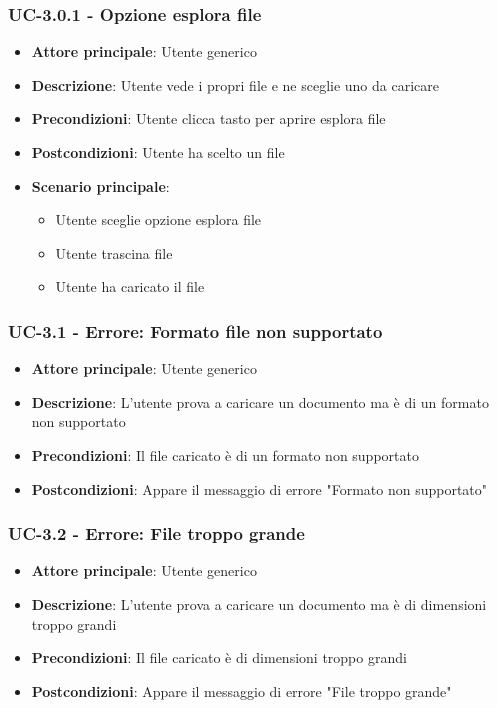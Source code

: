 \documentclass[11pt,a4paper]{article}
\begin{document}
\subsubsection{UC-3.0.1 - Opzione esplora file}
\begin{itemize}
    \item \textbf{Attore principale}: Utente generico
    \item \textbf{Descrizione}: Utente vede i propri file e ne sceglie uno da caricare
    \item \textbf{Precondizioni}: Utente clicca tasto per aprire esplora file
    \item \textbf{Postcondizioni}: Utente ha scelto un file
    \item \textbf{Scenario principale}:
        \begin{itemize}
            \item Utente sceglie opzione esplora file
            \item Utente trascina file
            \item Utente ha caricato il file
        \end{itemize}
\end{itemize}

\subsubsection{UC-3.1 - Errore: Formato file non supportato}
\begin{itemize}
    \item \textbf{Attore principale}: Utente generico
    \item \textbf{Descrizione}: L'utente prova a caricare un documento ma è di un formato non supportato
    \item \textbf{Precondizioni}: Il file caricato è di un formato non supportato
    \item \textbf{Postcondizioni}: Appare il messaggio di errore "Formato non supportato"
\end{itemize}


\subsubsection{UC-3.2 - Errore: File troppo grande}
\begin{itemize}
    \item \textbf{Attore principale}: Utente generico
    \item \textbf{Descrizione}: L'utente prova a caricare un documento ma è di dimensioni troppo grandi
    \item \textbf{Precondizioni}: Il file caricato è di dimensioni troppo grandi
    \item \textbf{Postcondizioni}: Appare il messaggio di errore "File troppo grande"
\end{itemize}
\end{document}
